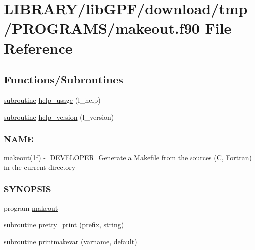 \hypertarget{makeout_8f90}{}\section{L\+I\+B\+R\+A\+R\+Y/lib\+G\+P\+F/download/tmp/\+P\+R\+O\+G\+R\+A\+M\+S/makeout.f90 File Reference}
\label{makeout_8f90}
\subsection*{Functions/\+Subroutines}
\begin{DoxyCompactItemize}
\item 
\hyperlink{M__stopwatch_83_8txt_acfbcff50169d691ff02d4a123ed70482}{subroutine} \hyperlink{makeout_8f90_a3e09a3b52ee8fb04eeb93fe5761626a8}{help\+\_\+usage} (l\+\_\+help)
\item 
\hyperlink{M__stopwatch_83_8txt_acfbcff50169d691ff02d4a123ed70482}{subroutine} \hyperlink{makeout_8f90_a39c21619b08a3c22f19e2306efd7f766}{help\+\_\+version} (l\+\_\+version)
\begin{DoxyCompactList}\small\item\em \subsubsection*{N\+A\+ME}

makeout(1f) -\/ \mbox{[}D\+E\+V\+E\+L\+O\+P\+ER\mbox{]} Generate a Makefile from the sources (C, Fortran) in the current directory \subsubsection*{S\+Y\+N\+O\+P\+S\+IS}\end{DoxyCompactList}\item 
program \hyperlink{makeout_8f90_affb61c1ee20c534b741b72ed67c9c778}{makeout}
\item 
\hyperlink{M__stopwatch_83_8txt_acfbcff50169d691ff02d4a123ed70482}{subroutine} \hyperlink{makeout_8f90_a19d72934b25646092ee224d98550892a}{pretty\+\_\+print} (prefix, \hyperlink{what__overview_81_8txt_a74cb7e955273b9f9157b4f0c18a38849}{string})
\item 
\hyperlink{M__stopwatch_83_8txt_acfbcff50169d691ff02d4a123ed70482}{subroutine} \hyperlink{makeout_8f90_a7a3ba6914f570677e23fd8754a666107}{printmakevar} (varname, default)
\end{DoxyCompactItemize}


